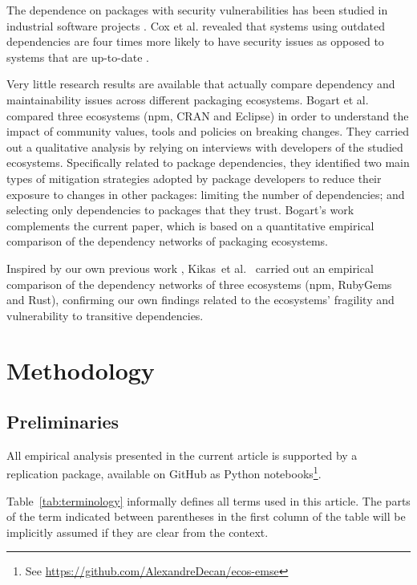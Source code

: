 \documentclass[smallextended]{svjour3}       %
\newcommand{\etal}{et al.\xspace}
\newcommand{\tab}[1]{Table~\ref{#1}}
\newcommand{\cran}{\textsf{CRAN}\xspace}
\newcommand{\rubygems}{\textsf{RubyGems}\xspace}
\newcommand{\eclipse}{\textsf{Eclipse}\xspace}
\newcommand{\npm}{\textsf{npm}\xspace}
\newcommand{\rust}{\textsf{Rust}\xspace}
\begin{document}
The dependence on packages with security vulnerabilities has been studied in industrial software projects \cite{Cadariu2015}. Cox \etal revealed that systems using outdated dependencies are four times more likely to have security issues as opposed to systems that are up-to-date \cite{Cox2015}.

Very little research results are available that actually compare dependency and maintainability issues across different packaging ecosystems.
Bogart \etal \cite{Bogart2016} compared three ecosystems (\npm, \cran and \eclipse) in order to understand the impact of community values, tools and policies on breaking changes. They carried out a qualitative analysis by relying on interviews with developers of the studied ecosystems. Specifically related to package dependencies, they identified two main types of mitigation strategies adopted by package developers to reduce their exposure to changes in other packages: limiting the number of dependencies; and selecting only dependencies to packages that they trust.
Bogart's work complements the current paper, which is based on a quantitative empirical comparison of the dependency networks of packaging ecosystems. 

Inspired by our own previous work \cite{Decan2016WEA, Decan2017SANER}, Kikas~\etal~\cite{Kikas2017MSR} carried out an empirical comparison of the dependency networks of three ecosystems (\npm, \rubygems and \rust), confirming our own findings related to the ecosystems' fragility and vulnerability to transitive dependencies.


\section{Methodology}\label{sec:methodo}

\subsection{Preliminaries}

All empirical analysis presented in the current article is supported by a replication package, available on GitHub as Python notebooks\footnote{See \url{https://github.com/AlexandreDecan/ecos-emse}}.

\tab{tab:terminology} informally defines all terms used in this article. The parts of the term indicated between parentheses in the first column of the table will be implicitly assumed if they are clear from the context. 
\end{document}
